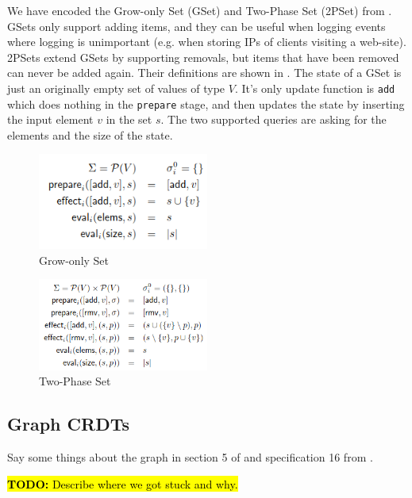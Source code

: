 \documentclass{article}
\newcommand{\TODO}[1]{\hl{\textbf{TODO:} #1}\xspace}
\begin{document}
We have encoded the Grow-only Set (GSet) and Two-Phase Set (2PSet)
from \cite{baquero2017pure}. GSets only support adding items, and they
can be useful when logging events where logging is unimportant
(e.g. when storing IPs of clients visiting a web-site). 2PSets extend
GSets by supporting removals, but items that have been removed can
never be added again. Their definitions are shown in
. The state of a GSet is just an
originally empty set of values of type $V$. It's only update function
is \texttt{add} which does nothing in the \texttt{prepare} stage, and
then updates the state by inserting the input element $v$ in the set
$s$. The two supported queries are asking for the elements and the
size of the state.

\begin{figure}[h]
    \centering
    \includegraphics[width=0.5\textwidth]{grow-only-set-definition}
    \caption{Grow-only Set}
    \label{fig:gset-def}
\end{figure}

\begin{figure}[h]
    \centering
    \includegraphics[width=0.5\textwidth]{2pset-definition}
    \caption{Two-Phase Set}
    \label{fig:2pset-def}
\end{figure}

\subsection{Graph CRDTs}

Say some things about the graph in section 5 of
\cite{shapiro2011conflict} and specification 16 from
\cite{shapiro2011comprehensive}.

\TODO{Describe where we got stuck and why.}



\end{document}
